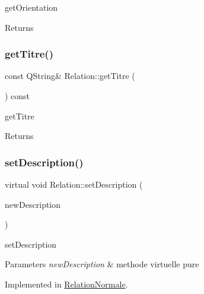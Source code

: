 get\+Orientation 

\begin{DoxyReturn}{Returns}

\end{DoxyReturn}
\mbox{\label{class_relation_a411be3a1dfc417342db768555a2afe41}} 
\subsubsection{\texorpdfstring{get\+Titre()}{getTitre()}}
{\footnotesize\ttfamily const Q\+String\& Relation\+::get\+Titre (\begin{DoxyParamCaption}{ }\end{DoxyParamCaption}) const\hspace{0.3cm}{\ttfamily [inline]}}



get\+Titre 

\begin{DoxyReturn}{Returns}

\end{DoxyReturn}
\mbox{\label{class_relation_a8f698cc45c38a849c4bcd8336fa5e2b3}} 
\subsubsection{\texorpdfstring{set\+Description()}{setDescription()}}
{\footnotesize\ttfamily virtual void Relation\+::set\+Description (\begin{DoxyParamCaption}\item[{const Q\+String \&}]{new\+Description }\end{DoxyParamCaption})\hspace{0.3cm}{\ttfamily [pure virtual]}}



set\+Description 


\begin{DoxyParams}{Parameters}
{\em new\+Description} & methode virtuelle pure \\
\hline
\end{DoxyParams}


Implemented in \hyperlink{class_relation_normale_a74c586177c06279726df02dd1d8b721a}{Relation\+Normale}.

